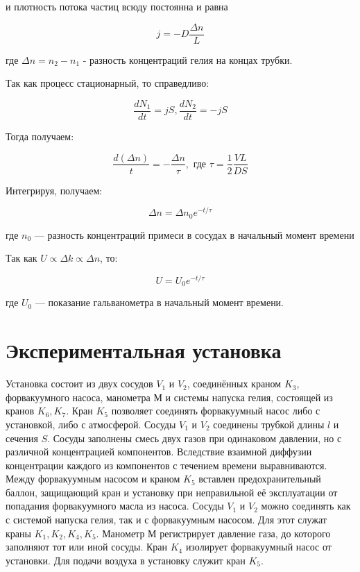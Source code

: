 \documentclass[12pt,a4paper]{article}
\begin{document}
и плотность потока частиц всюду постоянна и равна

\begin{equation}
j = -D \frac{\Delta n}{L}
\end{equation}

где $\Delta n = n_{2} - n_{1}$ - разность концентраций гелия на концах трубки.

Так как процесс стационарный,  то справедливо:

\begin{equation}
\frac{dN_1}{dt} = jS,  \frac{dN_2}{dt} = -jS
\end{equation}

Тогда получаем:

\begin{equation}
\frac{d(\Delta n)}{t} = - \frac{\Delta n}{\tau},  \text{ где } \tau = \frac{1}{2} \frac{VL}{DS}
\label{eq:get_D_for_graph}
\end{equation}

Интегрируя,  получаем:

\begin{equation}
\Delta n = \Delta n_0 e ^{-t/\tau}
\label{eq:delta_n_exponenta}
\end{equation}

где $n_{0}$ — разность концентраций примеси в сосудах в начальный момент
времени

Так как $U \propto \Delta k \propto \Delta n$,  то:

\begin{equation}
U = U_{0} e^{-t/\tau}
\label{eq:u_exponenta}
\end{equation}

где $U_0$ — показание гальванометра в начальный момент времени.

	
\section{Экспериментальная установка}

\item Установка состоит из двух сосудов $V_1$ и $V_2$, соединённых краном $K_3$, форвакуумного насоса,  манометра М и системы напуска гелия, состоящей из кранов $K_6,  K_7$.  Кран $K_5$ позволяет соединять форвакуумный насос либо с установкой,  либо с атмосферой.  Сосуды $V_1$ и $V_2$ соединены трубкой длины $l$ и сечения $S$. Сосуды заполнены смесь двух газов при одинаковом давлении,  но с различной концентрацией компонентов.  Вследствие взаимной диффузии концентрации каждого из компонентов с течением времени выравниваются. Между форвакуумным насосом и краном $K_5$ вставлен предохранительный баллон, защищающий кран и установку при неправильной её эксплуатации от попадания форвакуумного масла из насоса.  Сосуды $V_1$ и $V_2$ можно соединять как с системой напуска гелия,  так и с форвакуумным насосом.  Для этот служат краны $K_1, K_2, K_4, K_5$.  Манометр М регистрирует давление газа,  до которого заполняют тот или иной сосуды. Кран $K_4$ изолирует форвакуумный насос от установки.  Для подачи воздуха в установку служит кран $K_5$. 
\end{document}
